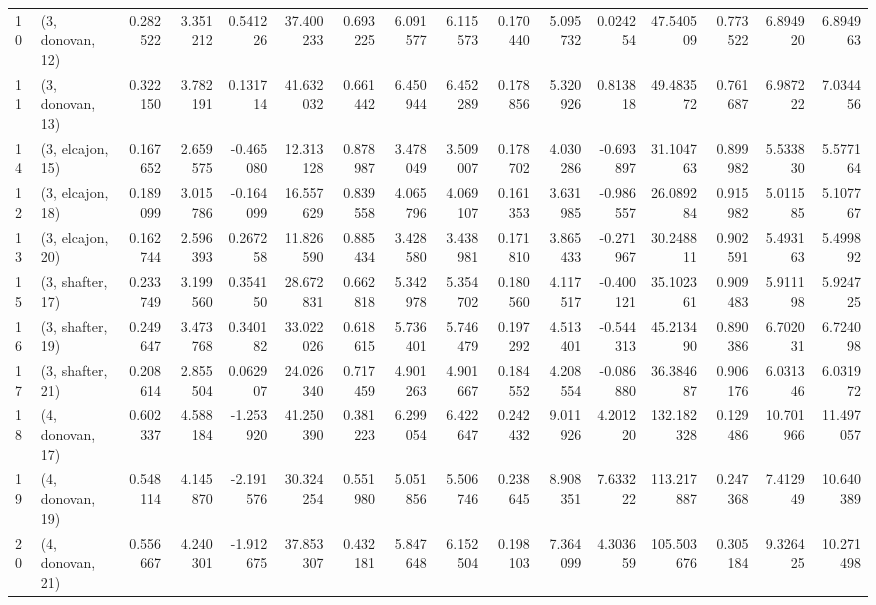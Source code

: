 \begin{tabular}{llrrrrrrrrrrrrrr}
10 &  (3, donovan, 12) &   0.282522 &  3.351212 &  0.541226 &  37.400233 &  0.693225 &   6.091577 &  6.115573 &  0.170440 &  5.095732 &  0.024254 &   47.540509 &  0.773522 &   6.894920 &   6.894963 \\
11 &  (3, donovan, 13) &   0.322150 &  3.782191 &  0.131714 &  41.632032 &  0.661442 &   6.450944 &  6.452289 &  0.178856 &  5.320926 &  0.813818 &   49.483572 &  0.761687 &   6.987222 &   7.034456 \\
14 &  (3, elcajon, 15) &   0.167652 &  2.659575 & -0.465080 &  12.313128 &  0.878987 &   3.478049 &  3.509007 &  0.178702 &  4.030286 & -0.693897 &   31.104763 &  0.899982 &   5.533830 &   5.577164 \\
12 &  (3, elcajon, 18) &   0.189099 &  3.015786 & -0.164099 &  16.557629 &  0.839558 &   4.065796 &  4.069107 &  0.161353 &  3.631985 & -0.986557 &   26.089284 &  0.915982 &   5.011585 &   5.107767 \\
13 &  (3, elcajon, 20) &   0.162744 &  2.596393 &  0.267258 &  11.826590 &  0.885434 &   3.428580 &  3.438981 &  0.171810 &  3.865433 & -0.271967 &   30.248811 &  0.902591 &   5.493163 &   5.499892 \\
15 &  (3, shafter, 17) &   0.233749 &  3.199560 &  0.354150 &  28.672831 &  0.662818 &   5.342978 &  5.354702 &  0.180560 &  4.117517 & -0.400121 &   35.102361 &  0.909483 &   5.911198 &   5.924725 \\
16 &  (3, shafter, 19) &   0.249647 &  3.473768 &  0.340182 &  33.022026 &  0.618615 &   5.736401 &  5.746479 &  0.197292 &  4.513401 & -0.544313 &   45.213490 &  0.890386 &   6.702031 &   6.724098 \\
17 &  (3, shafter, 21) &   0.208614 &  2.855504 &  0.062907 &  24.026340 &  0.717459 &   4.901263 &  4.901667 &  0.184552 &  4.208554 & -0.086880 &   36.384687 &  0.906176 &   6.031346 &   6.031972 \\
18 &  (4, donovan, 17) &   0.602337 &  4.588184 & -1.253920 &  41.250390 &  0.381223 &   6.299054 &  6.422647 &  0.242432 &  9.011926 &  4.201220 &  132.182328 &  0.129486 &  10.701966 &  11.497057 \\
19 &  (4, donovan, 19) &   0.548114 &  4.145870 & -2.191576 &  30.324254 &  0.551980 &   5.051856 &  5.506746 &  0.238645 &  8.908351 &  7.633222 &  113.217887 &  0.247368 &   7.412949 &  10.640389 \\
20 &  (4, donovan, 21) &   0.556667 &  4.240301 & -1.912675 &  37.853307 &  0.432181 &   5.847648 &  6.152504 &  0.198103 &  7.364099 &  4.303659 &  105.503676 &  0.305184 &   9.326425 &  10.271498 \\

\end{tabular}
